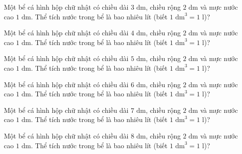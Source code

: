 
\begin{ex}
  Một bể cá hình hộp chữ nhật có chiều dài $3\text{ dm}$, chiều rộng $2\text{ dm}$ và mực nước cao $1\text{ dm}$. Thể tích nước trong bể là bao nhiêu lít (biết $1\text{ dm}^3 = 1\text{ l}$)?
\end{ex}

\begin{ex}
  Một bể cá hình hộp chữ nhật có chiều dài $4\text{ dm}$, chiều rộng $2\text{ dm}$ và mực nước cao $1\text{ dm}$. Thể tích nước trong bể là bao nhiêu lít (biết $1\text{ dm}^3 = 1\text{ l}$)?
\end{ex}

\begin{ex}
  Một bể cá hình hộp chữ nhật có chiều dài $5\text{ dm}$, chiều rộng $2\text{ dm}$ và mực nước cao $1\text{ dm}$. Thể tích nước trong bể là bao nhiêu lít (biết $1\text{ dm}^3 = 1\text{ l}$)?
\end{ex}

\begin{ex}
  Một bể cá hình hộp chữ nhật có chiều dài $6\text{ dm}$, chiều rộng $2\text{ dm}$ và mực nước cao $1\text{ dm}$. Thể tích nước trong bể là bao nhiêu lít (biết $1\text{ dm}^3 = 1\text{ l}$)?
\end{ex}

\begin{ex}
  Một bể cá hình hộp chữ nhật có chiều dài $7\text{ dm}$, chiều rộng $2\text{ dm}$ và mực nước cao $1\text{ dm}$. Thể tích nước trong bể là bao nhiêu lít (biết $1\text{ dm}^3 = 1\text{ l}$)?
\end{ex}

\begin{ex}
  Một bể cá hình hộp chữ nhật có chiều dài $8\text{ dm}$, chiều rộng $2\text{ dm}$ và mực nước cao $1\text{ dm}$. Thể tích nước trong bể là bao nhiêu lít (biết $1\text{ dm}^3 = 1\text{ l}$)?
\end{ex}

